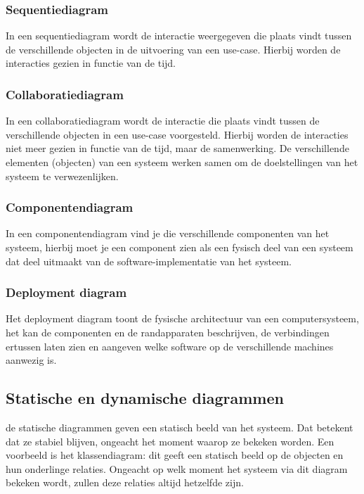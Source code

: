 \subsubsection{Sequentiediagram}

In een sequentiediagram wordt de interactie weergegeven die plaats vindt tussen de verschillende objecten in de uitvoering van een use-case. Hierbij worden de interacties gezien in functie van de tijd.

\subsubsection{Collaboratiediagram}

In een collaboratiediagram wordt de interactie die plaats vindt tussen de verschillende objecten in een use-case voorgesteld. Hierbij worden de interacties niet meer gezien in functie van de tijd, maar de samenwerking.
De verschillende elementen (objecten) van een systeem werken samen om de doelstellingen van het systeem te verwezenlijken.

\subsubsection{Componentendiagram}

In een componentendiagram vind je die verschillende componenten van het systeem, hierbij moet je een component zien als een fysisch deel van een systeem dat deel uitmaakt van de software-implementatie van het systeem.

\subsubsection{Deployment diagram}

Het deployment diagram toont de fysische architectuur van een computersysteem, het kan de componenten en de randapparaten beschrijven, de verbindingen ertussen laten zien en aangeven welke software op de verschillende machines aanwezig is.

\subsection{Statische en dynamische diagrammen}

de statische diagrammen geven een statisch beeld van het systeem. Dat betekent dat ze stabiel blijven, ongeacht het moment waarop ze bekeken worden. Een voorbeeld is het klassendiagram: dit geeft een statisch beeld op de objecten en hun onderlinge relaties. Ongeacht op welk moment het systeem via dit diagram bekeken wordt, zullen deze relaties altijd hetzelfde zijn.

